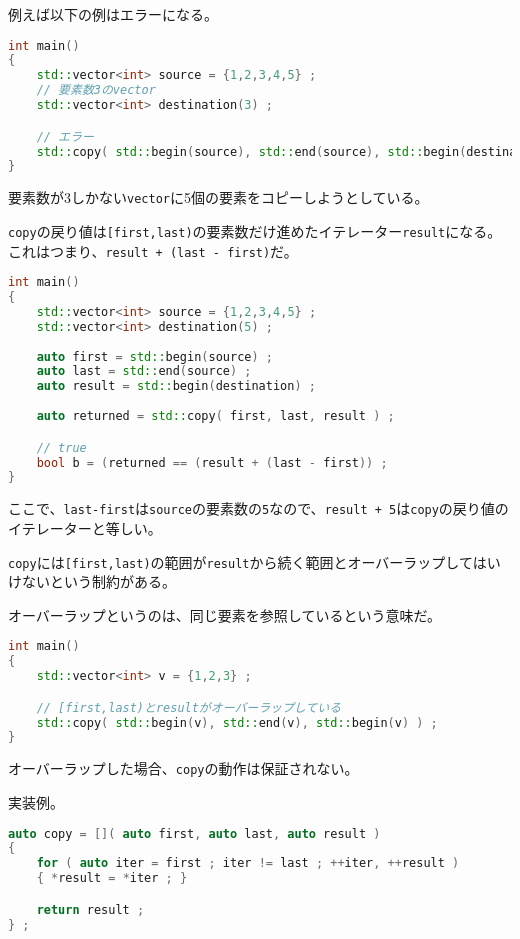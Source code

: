 例えば以下の例はエラーになる。

\begin{lstlisting}[language={C++}]
int main()
{
    std::vector<int> source = {1,2,3,4,5} ;
    // 要素数3のvector
    std::vector<int> destination(3) ;

    // エラー
    std::copy( std::begin(source), std::end(source), std::begin(destination) ) ;
}
\end{lstlisting}

要素数が3しかない\texttt{vector}に5個の要素をコピーしようとしている。

\texttt{copy}の戻り値は\texttt{[first,last)}の要素数だけ進めたイテレーター\texttt{result}になる。これはつまり、\texttt{result + (last - first)}だ。

\begin{lstlisting}[language={C++}]
int main()
{
    std::vector<int> source = {1,2,3,4,5} ;
    std::vector<int> destination(5) ;
    
    auto first = std::begin(source) ;
    auto last = std::end(source) ;
    auto result = std::begin(destination) ;
    
    auto returned = std::copy( first, last, result ) ;

    // true
    bool b = (returned == (result + (last - first)) ;
}
\end{lstlisting}

ここで、\texttt{last-first}は\texttt{source}の要素数の\texttt{5}なので、\texttt{result + 5}は\texttt{copy}の戻り値のイテレーターと等しい。

\texttt{copy}には\texttt{[first,last)}の範囲が\texttt{result}から続く範囲とオーバーラップしてはいけないという制約がある。

オーバーラップというのは、同じ要素を参照しているという意味だ。

\begin{lstlisting}[language={C++}]
int main()
{
    std::vector<int> v = {1,2,3} ;

    // [first,last)とresultがオーバーラップしている
    std::copy( std::begin(v), std::end(v), std::begin(v) ) ;
}
\end{lstlisting}

オーバーラップした場合、\texttt{copy}の動作は保証されない。

実装例。

\begin{lstlisting}[language={C++}]
auto copy = []( auto first, auto last, auto result )
{
    for ( auto iter = first ; iter != last ; ++iter, ++result )
    { *result = *iter ; }

    return result ;
} ;
\end{lstlisting}

